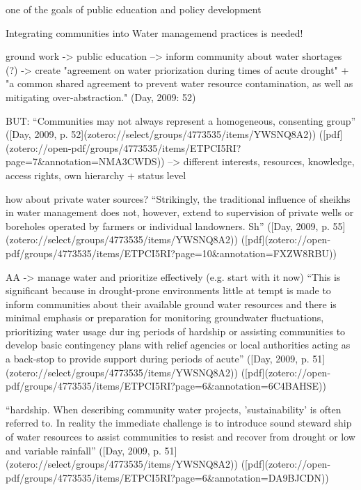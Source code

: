 







one of the goals of public education and policy development

Integrating communities into Water managemend practices is needed!

ground work -> public education --> inform community about water shortages (?) -> create "agreement on water priorization during times of acute drought" + "a common shared agreement to prevent water resource contamination, as well as mitigating over-abstraction." (Day, 2009: 52)

BUT:
“Communities may not always represent a homogeneous, consenting group” ([Day, 2009, p. 52](zotero://select/groups/4773535/items/YWSNQ8A2)) ([pdf](zotero://open-pdf/groups/4773535/items/ETPCI5RI?page=7&annotation=NMA3CWDS))
--> different interests, resources, knowledge, access rights, own hierarchy + status level

how about private water sources?
“Strikingly, the traditional influence of sheikhs in water management does not, however, extend to supervision of private wells or boreholes operated by farmers or individual landowners. Sh” ([Day, 2009, p. 55](zotero://select/groups/4773535/items/YWSNQ8A2)) ([pdf](zotero://open-pdf/groups/4773535/items/ETPCI5RI?page=10&annotation=FXZW8RBU))

AA -> manage water and prioritize effectively (e.g. start with it now)
“This is significant because in drought-prone environments little at tempt is made to inform communities about their available ground water resources and there is minimal emphasis or preparation for monitoring groundwater fluctuations, prioritizing water usage dur ing periods of hardship or assisting communities to develop basic contingency plans with relief agencies or local authorities acting as a back-stop to provide support during periods of acute” ([Day, 2009, p. 51](zotero://select/groups/4773535/items/YWSNQ8A2)) ([pdf](zotero://open-pdf/groups/4773535/items/ETPCI5RI?page=6&annotation=6C4BAHSE))

“hardship. When describing community water projects, 'sustainability' is often referred to. In reality the immediate challenge is to introduce sound steward ship of water resources to assist communities to resist and recover from drought or low and variable rainfall” ([Day, 2009, p. 51](zotero://select/groups/4773535/items/YWSNQ8A2)) ([pdf](zotero://open-pdf/groups/4773535/items/ETPCI5RI?page=6&annotation=DA9BJCDN))

